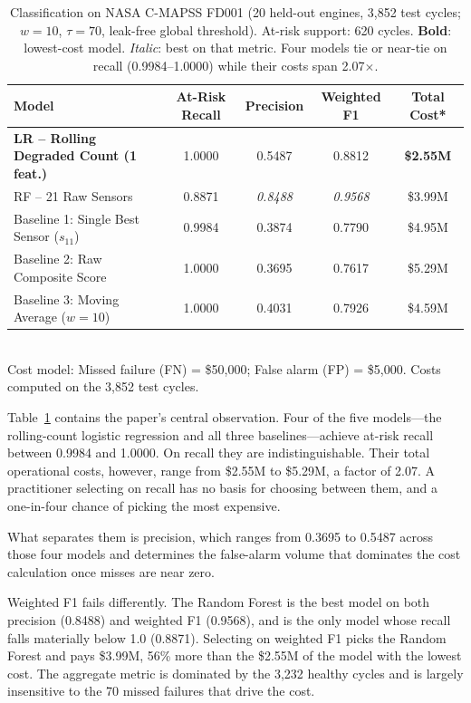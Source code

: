 \documentclass[10pt,twocolumn]{article}
\begin{document}
\begin{table}[t]
\centering
\caption{Classification on NASA C-MAPSS FD001 (20 held-out engines, 3,852 test cycles;
$w=10$, $\tau=70$, leak-free global threshold). At-risk support: 620 cycles.
\textbf{Bold}: lowest-cost model. \textit{Italic}: best on that metric.
Four models tie or near-tie on recall (0.9984--1.0000) while their costs span
2.07$\times$.}
\label{tab:results}
\vspace{4pt}
\small
\begin{tabular}{lcccc}
\toprule
Model & At-Risk Recall & Precision & Weighted F1 & Total Cost* \\
\midrule
\textbf{LR -- Rolling Degraded Count (1 feat.)} & 1.0000 & 0.5487 & 0.8812 & \textbf{\$2.55M} \\
RF -- 21 Raw Sensors & 0.8871 & \textit{0.8488} & \textit{0.9568} & \$3.99M \\
Baseline 1: Single Best Sensor ($s_{11}$) & 0.9984 & 0.3874 & 0.7790 & \$4.95M \\
Baseline 2: Raw Composite Score & 1.0000 & 0.3695 & 0.7617 & \$5.29M \\
Baseline 3: Moving Average ($w=10$) & 1.0000 & 0.4031 & 0.7926 & \$4.59M \\
\bottomrule
\end{tabular}
\\[2pt]
\small *Cost model: Missed failure (FN) = \$50,000; False alarm (FP) = \$5,000. Costs computed on the 3,852 test cycles.
\end{table}

Table~\ref{tab:results} contains the paper's central observation. Four of the five
models---the rolling-count logistic regression and all three baselines---achieve at-risk
recall between 0.9984 and 1.0000. On recall they are indistinguishable. Their total
operational costs, however, range from \$2.55M to \$5.29M, a factor of 2.07. A
practitioner selecting on recall has no basis for choosing between them, and a
one-in-four chance of picking the most expensive.

What separates them is precision, which ranges from 0.3695 to 0.5487 across those four
models and determines the false-alarm volume that dominates the cost calculation once
misses are near zero.

Weighted F1 fails differently. The Random Forest is the best model on both precision
(0.8488) and weighted F1 (0.9568), and is the only model whose recall falls materially
below 1.0 (0.8871). Selecting on weighted F1 picks the Random Forest and pays \$3.99M,
56\% more than the \$2.55M of the model with the lowest cost. The aggregate metric is
dominated by the 3,232 healthy cycles and is largely insensitive to the 70 missed
failures that drive the cost.
\end{document}
